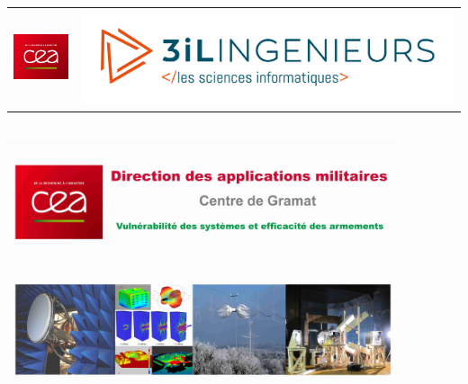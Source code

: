 \makeatletter
\begin{titlepage}

\thispagestyle{fancy}
\renewcommand\headrulewidth{0pt}
\renewcommand\footrulewidth{0pt}
\fancyfootoffset{20.8pt}
\rhead{}
\lhead{}



\begin{tabular}{m{8cm}m{\sizelogoecole\textwidth}}
\includegraphics[width=4cm]{fichier_configuration/logo-cea.png} & 
\includegraphics[width=\sizelogoecole\textwidth]{fichier_configuration/logo_ecole}
\end{tabular}


\vspace*{1cm}
\begin{center}

\textcolor{darkgreen}{\LARGE\textbf{\@title}} \\
\vspace{2cm}
\includegraphics[width=11.5cm]{fichier_configuration/image_une_LQ}


\end{center}
\end{titlepage}
